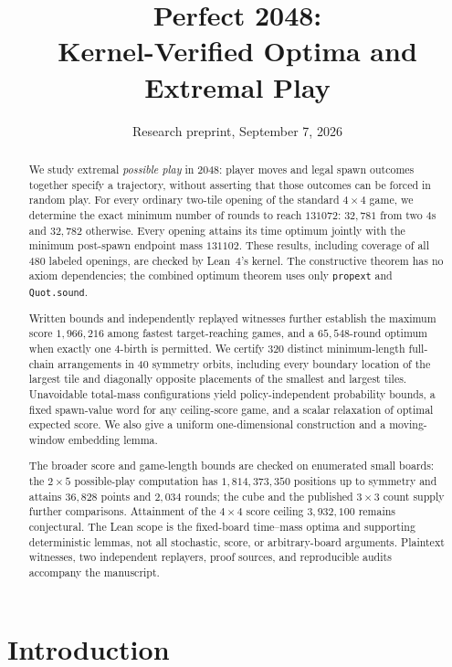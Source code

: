 \documentclass[11pt]{article}
\title{Perfect 2048:\\ Kernel-Verified Optima and Extremal Play}
\date{Research preprint, September 7, 2026}
\theoremstyle{definition}
\theoremstyle{remark}
\begin{document}
\maketitle

\begin{abstract}
We study extremal \emph{possible play} in 2048: player moves and legal
spawn outcomes together specify a trajectory, without asserting that
those outcomes can be forced in random play. For every ordinary two-tile
opening of the standard $4\times4$ game, we determine the exact minimum
number of rounds to reach $131072$: $32{,}781$ from two 4s and $32{,}782$
otherwise. Every opening attains its time optimum jointly with the
minimum post-spawn endpoint mass $131102$. These results, including
coverage of all 480 labeled openings, are checked by Lean~4's kernel.
The constructive theorem has no axiom dependencies; the combined
optimum theorem uses only \texttt{propext} and \texttt{Quot.sound}.

Written bounds and independently replayed witnesses further establish
the maximum score $1{,}966{,}216$ among fastest target-reaching games,
and a $65{,}548$-round optimum when exactly one 4-birth is permitted.
We certify 320 distinct minimum-length full-chain arrangements in 40
symmetry orbits, including every boundary location of the largest tile
and diagonally opposite placements of the smallest and largest tiles.
Unavoidable total-mass configurations yield policy-independent
probability bounds, a fixed spawn-value word for any ceiling-score game,
and a scalar relaxation of optimal expected score. We also give a
uniform one-dimensional construction and a moving-window embedding lemma.

The broader score and game-length bounds are checked on enumerated
small boards: the $2\times5$ possible-play computation has
$1{,}814{,}373{,}350$ positions up to symmetry and attains $36{,}828$
points and $2{,}034$ rounds; the cube and the published $3\times3$
count supply further comparisons. Attainment of the $4\times4$ score
ceiling $3{,}932{,}100$ remains conjectural. The Lean scope is the fixed-board
time--mass optima and supporting deterministic lemmas, not all stochastic,
score, or arbitrary-board arguments. Plaintext witnesses, two independent
replayers, proof sources, and reproducible audits accompany the manuscript.
\end{abstract}

\section{Introduction}
\end{document}
